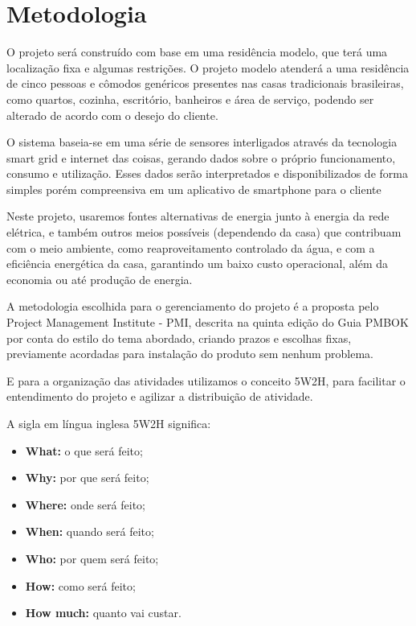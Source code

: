 \chapter{Metodologia}
\par O projeto será construído com base em uma residência modelo, que terá uma localização fixa e algumas restrições. O projeto modelo atenderá a uma residência de cinco pessoas e cômodos genéricos presentes nas casas tradicionais brasileiras, como quartos, cozinha, escritório, banheiros e área de serviço, podendo ser alterado de acordo com o desejo do cliente.
\par O sistema baseia-se em uma série de sensores interligados através da tecnologia smart grid e internet das coisas, gerando dados sobre o próprio funcionamento, consumo e utilização.  Esses dados serão interpretados e disponibilizados de forma simples porém compreensiva em um aplicativo de smartphone  para o cliente
\par Neste projeto, usaremos fontes alternativas de energia junto à energia da rede elétrica, e também outros meios possíveis (dependendo da casa) que contribuam com o meio ambiente, como reaproveitamento controlado da água, e com a eficiência energética da casa, garantindo um baixo custo operacional, além da economia ou até produção de energia.
\par A metodologia escolhida para o gerenciamento do projeto é a proposta pelo Project Management Institute - PMI, descrita na quinta edição do Guia PMBOK por conta do estilo do tema abordado, criando prazos e escolhas fixas, previamente acordadas para instalação do produto sem nenhum problema.
\par E para a organização das atividades utilizamos o conceito 5W2H, para facilitar o entendimento do projeto e agilizar a distribuição de atividade.
\par A sigla em língua inglesa 5W2H significa:
\begin{itemize}
    \item \textbf{What:} o que será feito;
    \item \textbf{Why:} por que será feito;
    \item \textbf{Where:} onde será feito;
    \item \textbf{When:} quando será feito;
    \item \textbf{Who:} por quem será feito;
    \item \textbf{How:} como será feito;
    \item \textbf{How much:} quanto vai custar.
\end{itemize}

